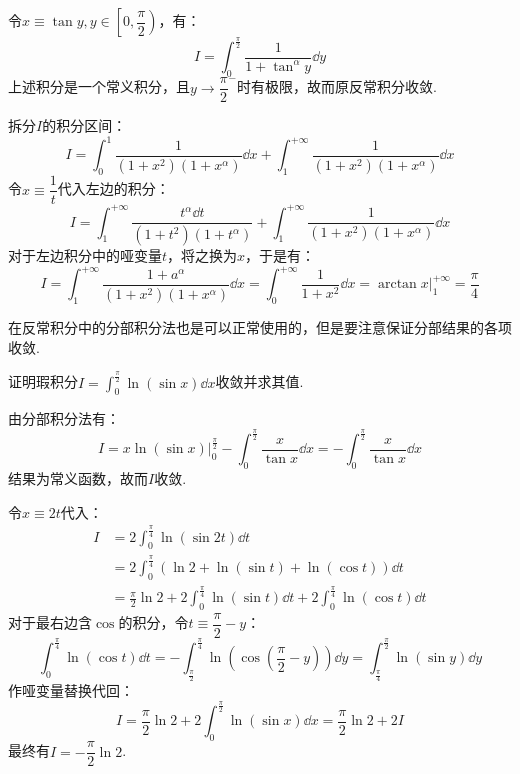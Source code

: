 \begin{solution}
    令$x \equiv \tan y,y\in\left[0,\dfrac{\pi}{2}\right)$，有：
    \[I = \int_{0}^{\frac{\pi}{2}}\frac{1}{1+\tan^\alpha y}\dd{y}\]
    上述积分是一个常义积分，且$y\to\dfrac{\pi}{2}^-$时有极限，故而原反常积分收敛.

    拆分$I$的积分区间：
    \[I = \int_{0}^{1}\frac{1}{(1+x^2)(1+x^\alpha)}\dd{x} + \int_{1}^{+\infty}\frac{1}{(1+x^2)(1+x^\alpha)}\dd{x}\]
    令$x\equiv\dfrac{1}{t}$代入左边的积分：
    \[I = \int_{1}^{+\infty}\frac{t^\alpha\dd{t}}{(1+t^2)(1+t^\alpha)} + \int_{1}^{+\infty}\frac{1}{(1+x^2)(1+x^\alpha)}\dd{x}\]
    对于左边积分中的哑变量$t$，将之换为$x$，于是有：
    \[I = \int_{1}^{+\infty}\frac{1+a^\alpha}{(1+x^2)(1+x^\alpha)}\dd{x} = \int_{0}^{+\infty}\frac{1}{1+x^2}\dd{x} = \arctan x\Big|_1^{+\infty} = \frac{\pi}{4}\]
\end{solution}

在反常积分中的分部积分法也是可以正常使用的，但是要注意保证分部结果的各项收敛.

\begin{question}
    证明瑕积分$\displaystyle I = \int_{0}^{\frac{\pi}{2}}\ln(\sin x)\dd{x}$收敛并求其值.
\end{question}

\begin{solution}
    由分部积分法有：
    \[I = x\ln(\sin x)\Big|_0^{\frac{\pi}{2}}-\int_{0}^{\frac{\pi}{2}}\frac{x}{\tan x}\dd{x} = -\int_{0}^{\frac{\pi}{2}}\frac{x}{\tan x}\dd{x}\]
    结果为常义函数，故而$I$收敛.

    令$x \equiv 2t$代入：
    \begin{align*}
        I &= 2\int_{0}^{\frac{\pi}{4}}\ln(\sin 2t)\dd{t}\\
        &= 2\int_{0}^{\frac{\pi}{4}}(\ln2 + \ln(\sin t) + \ln(\cos t))\dd{t}\\
        &= \frac{\pi}{2}\ln 2 + 2\int_{0}^{\frac{\pi}{4}}\ln(\sin t)\dd{t} + 2\int_{0}^{\frac{\pi}{4}}\ln(\cos t)\dd{t}
    \end{align*}
    对于最右边含$\cos$的积分，令$t \equiv \dfrac{\pi}{2} - y$：
    \[\int_{0}^{\frac{\pi}{4}}\ln(\cos t)\dd{t} = -\int_{\frac{\pi}{2}}^{\frac{\pi}{4}}\ln\left(\cos\left(\frac{\pi}{2}-y\right)\right)\dd{y} = \int_{\frac{\pi}{4}}^{\frac{\pi}{2}}\ln(\sin y)\dd{y}\]
    作哑变量替换代回：
    \[I = \frac{\pi}{2}\ln 2 + 2\int_{0}^{\frac{\pi}{2}}\ln(\sin x)\dd{x} = \frac{\pi}{2}\ln 2 + 2I\]
    最终有$I = -\dfrac{\pi}{2}\ln 2$.
\end{solution}